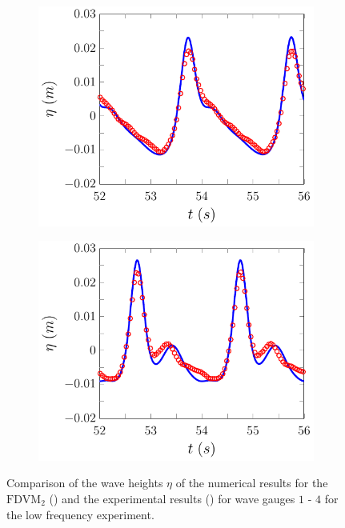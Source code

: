 \begin{figure}
	\begin{subfigure}{0.5\textwidth}
		\includegraphics[width=\textwidth]{./chp6/figures/Experiment/Beji/sl/FDVMWG3.pdf}
		\vspace{0.5cm}
	\end{subfigure}%
	\begin{subfigure}{0.5\textwidth}
		\includegraphics[width=\textwidth]{./chp6/figures/Experiment/Beji/sl/FDVMWG4.pdf}
		\vspace{0.5cm}
	\end{subfigure}
	\caption{Comparison of the wave heights $\eta$ of the numerical results for the $\text{FDVM}_2$ ({\color{blue}\solidrule}) and the experimental results () for wave gauges $1$ - $4$ for the low frequency experiment.}
	\label{fig:BejislWG1to4FDVM}
\end{figure}

